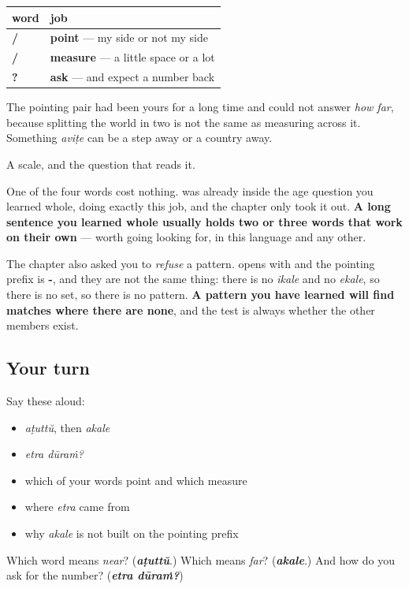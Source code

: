 \begin{grammarlens}[title={Grammar Lens: pointing and measuring are different jobs}]
\noindent
\begin{tabularx}{\linewidth}{@{}>{\raggedright\arraybackslash}X>{\raggedright\arraybackslash}X@{}}
\toprule
\textbf{word} & \textbf{job} \\
\midrule
\textbf{\ml{ഇവിടെ} / \ml{അവിടെ}} & \textbf{point} — my side or not my side \\
\textbf{\ml{അടുത്ത്} / \ml{അകലെ}} & \textbf{measure} — a little space or a lot \\
\textbf{\ml{എത്ര} \ml{ദൂരം}?} & \textbf{ask} — and expect a number back \\
\bottomrule
\end{tabularx}

The pointing pair had been yours for a long time and could not answer \emph{how far}, because splitting the world in two is not the same as measuring across it. Something \emph{aviṭe} can be a step away or a country away.
\end{grammarlens}

\begin{grammarlens}[title={What you've built}]
A scale, and the question that reads it.

One of the four words cost nothing. \textbf{} was already inside the age question you learned whole, doing exactly this job, and the chapter only took it out. \textbf{A long sentence you learned whole usually holds two or three words that work on their own} — worth going looking for, in this language and any other.

The chapter also asked you to \emph{refuse} a pattern. \textbf{} opens with \textbf{} and the pointing prefix is \textbf{-}, and they are not the same thing: there is no \emph{ikale} and no \emph{ekale}, so there is no set, so there is no pattern. \textbf{A pattern you have learned will find matches where there are none}, and the test is always whether the other members exist.
\end{grammarlens}

\subsection*{Your turn}
Say these aloud:

\begin{itemize}
\raggedright
  \item \emph{aṭuttŭ}, then \emph{akale}
  \item \emph{etra dūraṁ?}
  \item which of your words point and which measure
  \item where \emph{etra} came from
  \item why \emph{akale} is not built on the pointing prefix
\end{itemize}

\begin{tcolorbox}[breakable,colback=teal!4,colframe=teal!35!black,title={Before you move on}]
Which word means \emph{near}? (\emph{\textbf{aṭuttŭ}}.) Which means \emph{far}? (\emph{\textbf{akale}}.) And how do you ask for the number? (\emph{\textbf{etra dūraṁ?}})
\end{tcolorbox}
